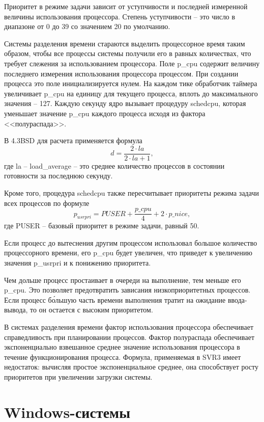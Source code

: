 Приоритет в режиме задачи зависит от уступчивости и последней измеренной величины использования процессора. Степень уступчивости -- это число в диапазоне от 0 до 39 со значением 20 по умолчанию. 

Системы разделения времени стараются выделить процессорное время таким образом, чтобы все процессы системы получили его в равных количествах, что требует слежения за использованием процессора. Поле {\ttfamily p{\_}cpu} содержит величину последнего измерения использования процессора процессом. При создании процесса это поле инициализируется нулем. На каждом тике обработчик таймера увеличивает {\ttfamily p{\_}cpu} на единицу для текущего процесса, вплоть до максимального значения -- 127. Каждую секунду ядро вызывает процедуру {\ttfamily schedcpu}, которая уменьшает значение {\ttfamily p{\_}cpu} каждого процесса исходя из фактора <<полураспада>>. 

В 4.3BSD для расчета применяется формула
\[
d = \frac{2\cdot la}{2\cdot la + 1},
\]
где {\ttfamily la} -- {\ttfamily load{\_}average} -- это среднее количество процессов в состоянии готовности за последнюю секунду.

Кроме того, процедура {\ttfamily schedcpu} также пересчитывает приоритеты режима задачи всех процессов по формуле
\[
{p_{usrpri}} = PUSER + \frac{p{\_}cpu}{4} + 2\cdot {p{\_}nice},
\]
где {\ttfamily PUSER} -- базовый приоритет в режиме задачи, равный 50.

Если процесс до вытеснения другим процессом использовал большое количество процессорного времени, его {\ttfamily p{\_}cpu} будет увеличен, что приведет к увеличению значения {\ttfamily p{\_}usrpri} и к понижению приоритета.

Чем дольше процесс простаивает в очереди на выполнение, тем меньше его {\ttfamily p{\_}cpu}. Это позволяет предотвратить зависания низкоприоритетных процессов. Если процесс б\'{о}льшую часть времени выполнения тратит на ожидание ввода-вывода, то он остается с высоким приоритетом.

В системах разделения времени фактор использования процессора обеспечивает справедливость при планировании процессов. Фактор полураспада обеспечивает экспоненциально взвешанное среднее значение использования процессора в течение функционирования процесса. Формула, применяемая в SVR3 имеет недостаток: вычисляя простое экспоненциальное среднее, она способствует росту приоритетов при увеличении загрузки системы.

\section{Windows-системы}


